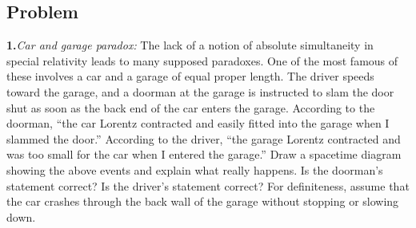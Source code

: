 
\subsection*{Problem}

\noindent\textbf{1.}\label{prob:1.1}\quad\emph{Car and garage paradox:} The lack of
a notion of absolute simultaneity in special relativity leads to many supposed
paradoxes. One of the most famous of these involves a car and a garage of equal
proper length. The driver speeds toward the garage, and a doorman at the garage is
instructed to slam the door shut as soon as the back end of the car enters the garage.
According to the doorman, ``the car Lorentz contracted and easily fitted into the garage
when I slammed the door.'' According to the driver, ``the garage Lorentz contracted and
was too small for the car when I entered the garage.'' Draw a spacetime diagram
showing the above events and explain what really happens. Is the doorman's statement
correct? Is the driver's statement correct? For definiteness, assume that the car crashes
through the back wall of the garage without stopping or slowing down.
